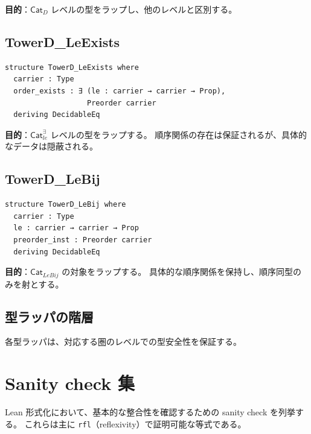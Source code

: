 \documentclass[a4paper,12pt]{ltjsarticle}
\theoremstyle{definition}
\begin{document}
\textbf{目的}：$\mathsf{Cat}_D$ レベルの型をラップし、他のレベルと区別する。

\subsection{TowerD\_LeExists}

\begin{verbatim}
structure TowerD_LeExists where
  carrier : Type
  order_exists : ∃ (le : carrier → carrier → Prop),
                   Preorder carrier
  deriving DecidableEq
\end{verbatim}

\textbf{目的}：$\mathsf{Cat}_{le}^{\exists}$ レベルの型をラップする。
順序関係の存在は保証されるが、具体的なデータは隠蔽される。

\subsection{TowerD\_LeBij}

\begin{verbatim}
structure TowerD_LeBij where
  carrier : Type
  le : carrier → carrier → Prop
  preorder_inst : Preorder carrier
  deriving DecidableEq
\end{verbatim}

\textbf{目的}：$\mathsf{Cat}_{LeBij}$ の対象をラップする。
具体的な順序関係を保持し、順序同型のみを射とする。

\subsection{型ラッパの階層}

\begin{center}
\end{center}

各型ラッパは、対応する圏のレベルでの型安全性を保証する。


\section{Sanity check 集}

Lean 形式化において、基本的な整合性を確認するための sanity check を列挙する。
これらは主に \texttt{rfl}（reflexivity）で証明可能な等式である。
\end{document}
